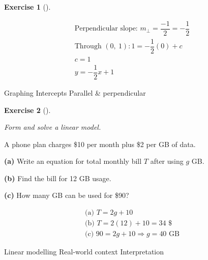 \documentclass[
  letterpaper,
  DIV=11,
  numbers=noendperiod]{scrreprt}
\theoremstyle{definition}
\newtheorem{exercise}{Exercise}[chapter]
\theoremstyle{remark}
\begin{document}
\begin{exercise}[]
\begin{tcolorbox}
\[
\begin{aligned}
\text{Perpendicular slope: } m_\perp = \dfrac{-1}{2} = -\dfrac{1}{2} \\[4pt] \text{Through }(0,\ 1): 1 = -\dfrac{1}{2}(0) + c \\[4pt] c = 1 \\[4pt] y = -\dfrac{1}{2}x + 1
\end{aligned}
\]

\end{tcolorbox}

{Graphing} {Intercepts} {Parallel \& perpendicular}

\end{exercise}

\begin{exercise}[]\protect\hypertarget{exr-u7-17}{}\label{exr-u7-17}

\emph{Form and solve a linear model.}

A phone plan charges \$10 per month plus \$2 per GB of data.

\textbf{(a)} Write an equation for total monthly bill \(T\) after using
\(g\) GB.

\textbf{(b)} Find the bill for 12 GB usage.

\textbf{(c)} How many GB can be used for \$90?

\begin{tcolorbox}[enhanced jigsaw, opacitybacktitle=0.6, coltitle=black, arc=.35mm, colframe=quarto-callout-tip-color-frame, colback=white, bottomrule=.15mm, left=2mm, colbacktitle=quarto-callout-tip-color!10!white, titlerule=0mm, opacityback=0, title=\textcolor{quarto-callout-tip-color}{\faLightbulb}\hspace{0.5em}{🔍 View Solution}, leftrule=.75mm, breakable, rightrule=.15mm, bottomtitle=1mm, toptitle=1mm, toprule=.15mm]

\[
\begin{aligned}
\text{(a) } T = 2g + 10 \\[4pt] \text{(b) } T = 2(12) + 10 = 34 \text{ \$} \\[4pt] \text{(c) } 90 = 2g + 10 \Rightarrow g = 40 \text{ GB}
\end{aligned}
\]

\end{tcolorbox}

{Linear modelling} {Real-world context} {Interpretation}

\end{exercise}
\end{document}
